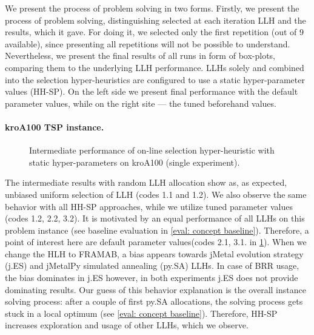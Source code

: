 We present the process of problem solving in two forms. Firstly, we present the process of problem solving, distinguishing selected at each iteration LLH and the results, which it gave. For doing it, we selected only the first repetition (out of 9 available), since presenting all repetitions will not be possible to understand. Nevertheless, we present the final results of all runs in form of box-plots, comparing them to the underlying LLH performance. LLHs solely and combined into the selection hyper-heuristics are configured to use a static hyper-parameter values (HH-SP). On the left side we present final performance with the default parameter values, while on the right site — the tuned beforehand values.



\newpage
\paragraph{kroA100 TSP instance.}
\begin{figure}[t]
	\centering
	\vspace{-20pt}
	
	\caption{Intermediate performance of on-line selection hyper-heuristic with static hyper-parameters on kroA100 (single experiment).}
	\vspace{-10pt}
	\label{eval:pict:hh-sp:kroA100 intermediate}
\end{figure}
The intermediate results with random LLH allocation show as, as expected, unbiased uniform selection of LLH (codes 1.1 and 1.2). We also observe the same behavior with all HH-SP approaches, while we utilize tuned parameter values (codes 1.2, 2.2, 3.2). It is motivated by an equal performance of all LLHs on this problem instance (see baseline evaluation in \cref{eval: concept baseline}). Therefore, a point of interest here are default parameter values(codes 2.1, 3.1. in \cref{eval:pict:hh-sp:kroA100 intermediate}). When we change the HLH to FRAMAB, a bias appears towards jMetal evolution strategy (j.ES) and jMetalPy simulated annealing (py.SA) LLHs. In case of BRR usage, the bias dominates in j.ES however, in both experiments j.ES does not provide dominating results. Our guess of this behavior explanation is the overall instance solving process: after a couple of first py.SA allocations, the solving process gets stuck in a local optimum (see \cref{eval: concept baseline}). Therefore, HH-SP increases exploration and usage of other LLHs, which we observe.


